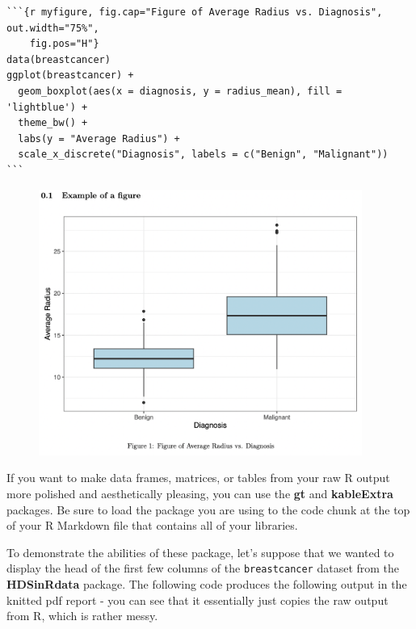 \documentclass[
  letterpaper,
]{krantz}
\begin{document}
\begin{verbatim}
```{r myfigure, fig.cap="Figure of Average Radius vs. Diagnosis", out.width="75%", 
    fig.pos="H"}
data(breastcancer)
ggplot(breastcancer) + 
  geom_boxplot(aes(x = diagnosis, y = radius_mean), fill = 'lightblue') +
  theme_bw() + 
  labs(y = "Average Radius") + 
  scale_x_discrete("Diagnosis", labels = c("Benign", "Malignant"))
```
\end{verbatim}

\begin{figure}

{\centering \includegraphics[width=4.16667in,height=\textheight]{book/images/12-example-figure.png}

}

\end{figure}

If you want to make data frames, matrices, or tables from your raw R
output more polished and aesthetically pleasing, you can use the
\textbf{gt} and \textbf{kableExtra} packages. Be sure to load the
package you are using to the code chunk at the top of your R Markdown
file that contains all of your libraries.

To demonstrate the abilities of these package, let's suppose that we
wanted to display the head of the first few columns of the
\texttt{breastcancer} dataset from the \textbf{HDSinRdata} package. The
following code produces the following output in the knitted pdf report -
you can see that it essentially just copies the raw output from R, which
is rather messy.
\end{document}

